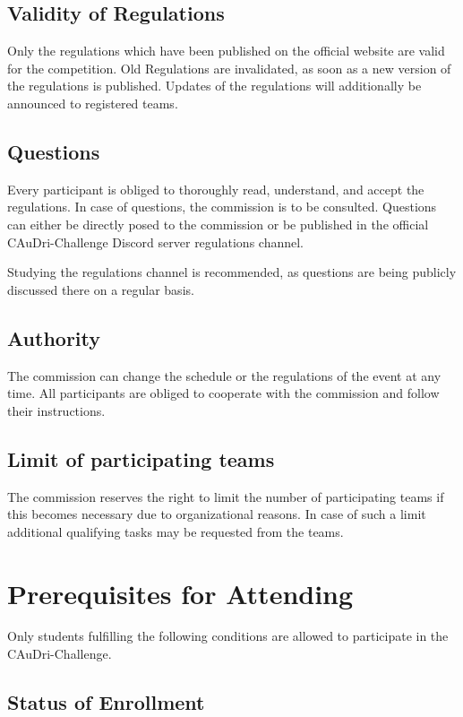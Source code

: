 \documentclass[a4paper]{report}
\begin{document}
\section{Validity of Regulations}

Only the regulations which have been published on the official website are
valid for the competition. Old Regulations are invalidated, as soon as a new
version of the regulations is published. Updates of the regulations will
additionally be announced to registered teams.

\section{Questions}

Every participant is obliged to thoroughly read, understand, and accept the
regulations. In case of questions, the commission is to be consulted. Questions
can either be directly posed to the commission or be published in the official
CAuDri-Challenge Discord server regulations channel.

Studying the regulations channel is recommended, as questions are being
publicly discussed there on a regular basis.

\section{Authority}

The commission can change the schedule or the regulations of the event at any
time. All participants are obliged to cooperate with the commission and follow
their instructions.

\section{Limit of participating teams}

The commission reserves the right to limit the number of participating teams if
this becomes necessary due to organizational reasons. In case of such a limit
additional qualifying tasks may be requested from the teams.

\chapter{Prerequisites for Attending}

Only students fulfilling the following conditions are allowed to participate in
the CAuDri-Challenge.

\section{Status of Enrollment}
\end{document}
